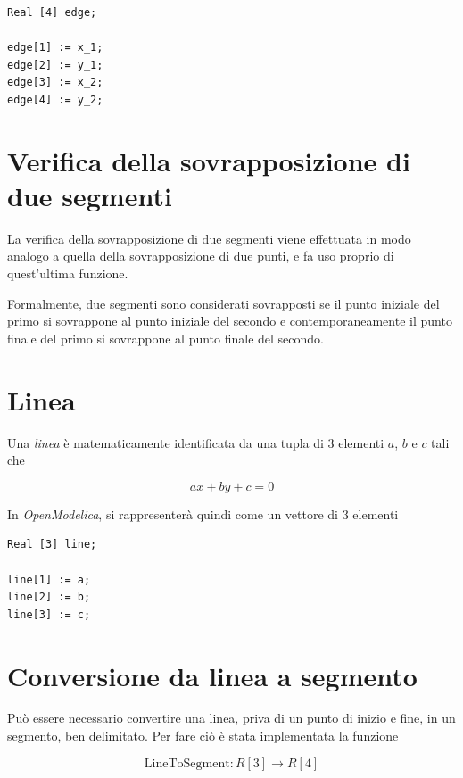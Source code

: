\documentclass[11pt,a4paper]{report}
\newcommand{\modelicaclass}[1]{
	
}
\begin{document}
\begin{lstlisting}[language=Modelica]
Real [4] edge;

edge[1] := x_1;
edge[2] := y_1;
edge[3] := x_2;
edge[4] := y_2;
\end{lstlisting}

\section{Verifica della sovrapposizione di due segmenti}

La verifica della sovrapposizione di due segmenti viene effettuata in modo analogo a quella della sovrapposizione di due punti, e fa uso proprio di quest'ultima funzione.

Formalmente, due segmenti sono considerati sovrapposti se il punto iniziale del primo si sovrappone al punto iniziale del secondo e contemporaneamente il punto finale del primo si sovrappone al punto finale del secondo.

\begin{figure}[H]
\modelicaclass{EdgesAreClose.mo}
\end{figure}

\section{Linea}

Una \textit{linea} è matematicamente identificata da una tupla di 3 elementi $a$, $b$ e $c$ tali che

\[
a x + b y + c = 0
\]

In \textit{OpenModelica}, si rappresenterà quindi come un vettore di 3 elementi
\begin{lstlisting}[language=Modelica]
Real [3] line;

line[1] := a;
line[2] := b;
line[3] := c;
\end{lstlisting}

\section{Conversione da linea a segmento}

Può essere necessario convertire una linea, priva di un punto di inizio e fine, in un segmento, ben delimitato. Per fare ciò è stata implementata la funzione

\[
	\text{LineToSegment} : R[3] \longrightarrow R[4]
\]

\modelicaclass{LineToSegment.mo}
\end{document}
